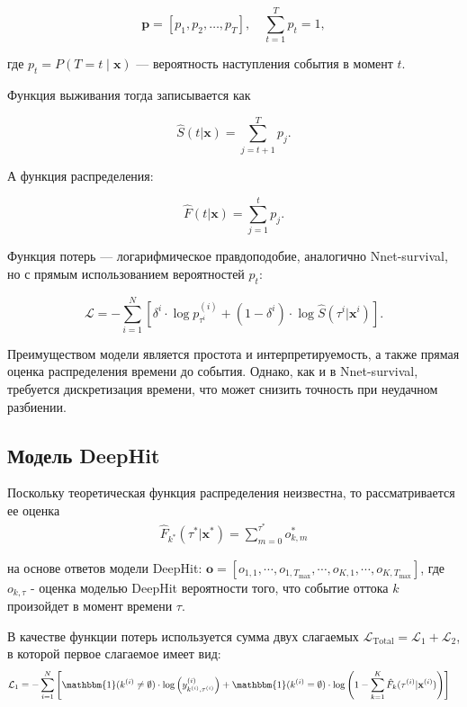 \documentclass[a4paper,14pt,oneside,openany]{memoir}
\begin{document}
\begin{equation}
	\mathbf{p} = [p_1, p_2, \ldots, p_T], \quad \sum_{t=1}^T p_t = 1,
\end{equation}

где $p_t = P(T = t \mid \mathbf{x})$ — вероятность наступления события в момент $t$.

Функция выживания тогда записывается как

\begin{equation}
	\hat{S}(t|\mathbf{x}) = \sum_{j=t+1}^T p_j.
\end{equation}

А функция распределения:

\begin{equation}
	\hat{F}(t|\mathbf{x}) = \sum_{j=1}^t p_j.
\end{equation}

Функция потерь — логарифмическое правдоподобие, аналогично Nnet-survival, но с прямым использованием вероятностей $p_t$:

\begin{equation}
	\mathcal{L} = -\sum_{i=1}^N \left[
	\delta^i \cdot \log p_{\tau^i}^{(i)} + (1 - \delta^i) \cdot \log \hat{S}(\tau^i|\mathbf{x}^i)
	\right].
\end{equation}

Преимуществом модели является простота и интерпретируемость, а также прямая оценка распределения времени до события. Однако, как и в Nnet-survival, требуется дискретизация времени, что может снизить точность при неудачном разбиении.

\subsection{Модель DeepHit}

Поскольку теоретическая функция распределения неизвестна, то рассматривается ее оценка 
\begin{equation}
	\begin{aligned}
		\hat{F}_{k^*}(\tau^*|\mathbf{x}^*)=\sum_{m=0}^{\tau^*}o_{k,m}^*
	\end{aligned}
\end{equation}

на основе ответов модели DeepHit: $\mathbf{o}=[o_{1,1},\cdots,o_{1,T_{\max}},\cdots,o_{K,1},\cdots,o_{K,T_{\max}}]$, где $o_{k,\tau}$ - оценка моделью DeepHit вероятности того, что событие оттока $k$ произойдет в момент времени $\tau$.

В качестве функции потерь используется сумма двух слагаемых $\mathcal{L}_{\mathrm{Total}}=\mathcal{L}_1+\mathcal{L}_2$, в которой первое слагаемое имеет вид: 
\begin{equation}
	\begin{aligned}
		\mathcal{L}_{1} & = -\sum_{i=1}^N \left[\mathbbm{1}(k^{(i)}\neq\emptyset)\cdot\log\left(y_{k^{(i)},\tau^{(i)}}^{(i)}\right)  + \mathbbm{1}(k^{(i)}=\emptyset)\cdot\log\left(1-\sum_{k=1}^K\hat{F}_k(\tau^{(i)}|\mathbf{x}^{(i)})\right)\right]
	\end{aligned}
\end{equation}
\end{document}
